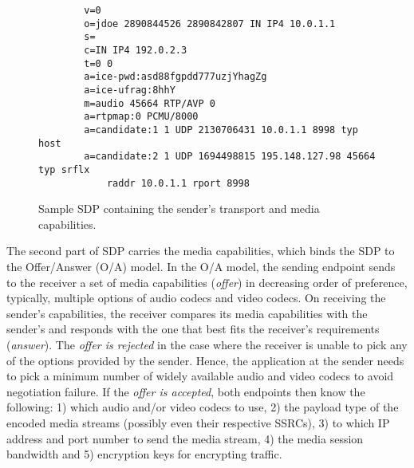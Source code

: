 
\begin{figure}[!h]
{\small
\begin{verbatim}
        v=0
        o=jdoe 2890844526 2890842807 IN IP4 10.0.1.1
        s=
        c=IN IP4 192.0.2.3
        t=0 0
        a=ice-pwd:asd88fgpdd777uzjYhagZg
        a=ice-ufrag:8hhY
        m=audio 45664 RTP/AVP 0
        a=rtpmap:0 PCMU/8000
        a=candidate:1 1 UDP 2130706431 10.0.1.1 8998 typ host
        a=candidate:2 1 UDP 1694498815 195.148.127.98 45664 typ srflx 
            raddr 10.0.1.1 rport 8998
\end{verbatim}}
\caption{Sample SDP containing the sender's transport and media capabilities.}
\label{fig:3:sdp}
\end{figure}

The second part of SDP carries the media capabilities, which binds the SDP to
the Offer/Answer (O/A) model. In the O/A model, the sending endpoint sends to
the receiver a set of media capabilities (\emph{offer}) in decreasing order of
preference, typically, multiple options of audio codecs and video codecs. On
receiving the sender's capabilities, the receiver compares its media
capabilities with the sender's and responds with the one that best fits the
receiver's requirements (\emph{answer}). The \emph{offer is rejected} in the
case where the receiver is unable to pick any of the options provided by the
sender. Hence, the application at the sender needs to pick a minimum number of
widely available audio and video codecs to avoid negotiation failure. If the
\emph{offer is accepted}, both endpoints then know the following: 1) which
audio and/or video codecs to use, 2) the payload type of the encoded media
streams (possibly even their respective SSRCs), 3) to which IP address and
port number to send the media stream, 4) the media session bandwidth and 5)
encryption keys for encrypting traffic.

